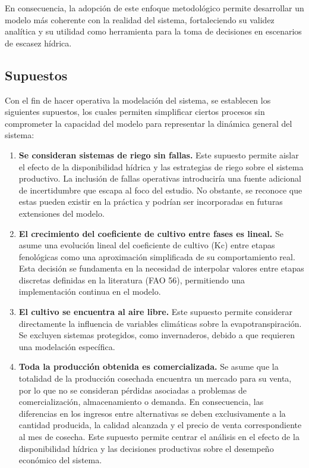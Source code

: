 \documentclass[12pt]{report}
\begin{document}
En consecuencia, la adopción de este enfoque metodológico permite desarrollar un modelo más coherente con la realidad del sistema, fortaleciendo su validez analítica y su utilidad como herramienta para la toma de decisiones en escenarios de escasez hídrica. 

\subsection{Supuestos}

Con el fin de hacer operativa la modelación del sistema, se establecen los siguientes supuestos, los cuales permiten simplificar ciertos procesos sin comprometer la capacidad del modelo para representar la dinámica general del sistema:

\begin{enumerate}

    \item \textbf{Se consideran sistemas de riego sin fallas.}  
    Este supuesto permite aislar el efecto de la disponibilidad hídrica y las estrategias de riego sobre el sistema productivo. La inclusión de fallas operativas introduciría una fuente adicional de incertidumbre que escapa al foco del estudio. No obstante, se reconoce que estas pueden existir en la práctica y podrían ser incorporadas en futuras extensiones del modelo.

    \item \textbf{El crecimiento del coeficiente de cultivo entre fases es lineal.}  
    Se asume una evolución lineal del coeficiente de cultivo (Kc) entre etapas fenológicas como una aproximación simplificada de su comportamiento real. Esta decisión se fundamenta en la necesidad de interpolar valores entre etapas discretas definidas en la literatura (FAO 56), permitiendo una implementación continua en el modelo.

    \item \textbf{El cultivo se encuentra al aire libre.}  
    Este supuesto permite considerar directamente la influencia de variables climáticas sobre la evapotranspiración. Se excluyen sistemas protegidos, como invernaderos, debido a que requieren una modelación específica. 
    
    \item \textbf{Toda la producción obtenida es comercializada.}  
    Se asume que la totalidad de la producción cosechada encuentra un mercado para su venta, por lo que no se consideran pérdidas asociadas a problemas de comercialización, almacenamiento o demanda. En consecuencia, las diferencias en los ingresos entre alternativas se deben exclusivamente a la cantidad producida, la calidad alcanzada y el precio de venta correspondiente al mes de cosecha. Este supuesto permite centrar el análisis en el efecto de la disponibilidad hídrica y las decisiones productivas sobre el desempeño económico del sistema.

\end{enumerate}
\end{document}
